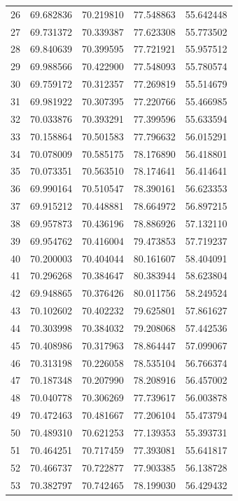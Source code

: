\begin{table}
\begin{tabular}{rrrrr}
26 & 69.682836 & 70.219810 & 77.548863 & 55.642448 \\
27 & 69.731372 & 70.339387 & 77.623308 & 55.773502 \\
28 & 69.840639 & 70.399595 & 77.721921 & 55.957512 \\
29 & 69.988566 & 70.422900 & 77.548093 & 55.780574 \\
30 & 69.759172 & 70.312357 & 77.269819 & 55.514679 \\
31 & 69.981922 & 70.307395 & 77.220766 & 55.466985 \\
32 & 70.033876 & 70.393291 & 77.399596 & 55.633594 \\
33 & 70.158864 & 70.501583 & 77.796632 & 56.015291 \\
34 & 70.078009 & 70.585175 & 78.176890 & 56.418801 \\
35 & 70.073351 & 70.563510 & 78.174641 & 56.414641 \\
36 & 69.990164 & 70.510547 & 78.390161 & 56.623353 \\
37 & 69.915212 & 70.448881 & 78.664972 & 56.897215 \\
38 & 69.957873 & 70.436196 & 78.886926 & 57.132110 \\
39 & 69.954762 & 70.416004 & 79.473853 & 57.719237 \\
40 & 70.200003 & 70.404044 & 80.161607 & 58.404091 \\
41 & 70.296268 & 70.384647 & 80.383944 & 58.623804 \\
42 & 69.948865 & 70.376426 & 80.011756 & 58.249524 \\
43 & 70.102602 & 70.402232 & 79.625801 & 57.861627 \\
44 & 70.303998 & 70.384032 & 79.208068 & 57.442536 \\
45 & 70.408986 & 70.317963 & 78.864447 & 57.099067 \\
46 & 70.313198 & 70.226058 & 78.535104 & 56.766374 \\
47 & 70.187348 & 70.207990 & 78.208916 & 56.457002 \\
48 & 70.040778 & 70.306269 & 77.739617 & 56.003878 \\
49 & 70.472463 & 70.481667 & 77.206104 & 55.473794 \\
50 & 70.489310 & 70.621253 & 77.139353 & 55.393731 \\
51 & 70.464251 & 70.717459 & 77.393081 & 55.641817 \\
52 & 70.466737 & 70.722877 & 77.903385 & 56.138728 \\
53 & 70.382797 & 70.742465 & 78.199030 & 56.429432 \\

\end{tabular}
\end{table}
